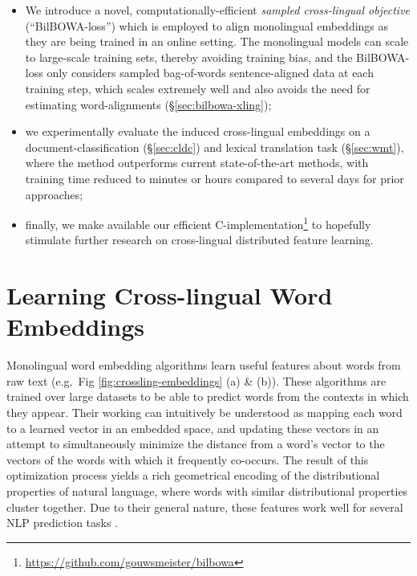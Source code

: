 \documentclass[10pt]{article}
\begin{document}
\begin{itemize}
  \item We introduce a novel, computationally-efficient \emph{sampled
    cross-lingual objective} (``BilBOWA-loss'') which is employed to
    align monolingual embeddings as they are being trained in an online
    setting. The monolingual models can scale to large-scale training sets,
    thereby avoiding training bias, and the BilBOWA-loss only
    considers sampled bag-of-words sentence-aligned data at each training step,
    which scales extremely well and also avoids the need for estimating
    word-alignments (\S \ref{sec:bilbowa-xling});

  \item we experimentally evaluate the induced cross-lingual embeddings on a
    document-classification (\S \ref{sec:cldc}) and lexical translation task 
    (\S \ref{sec:wmt}), where the method outperforms current 
    state-of-the-art methods, with training time reduced to minutes or hours 
    compared to several days for prior approaches;

  \item finally, we make available our efficient C-implementation\footnote{
    \url{https://github.com/gouwsmeister/bilbowa}} to hopefully stimulate 
    further research on cross-lingual distributed feature learning.
\end{itemize}

\section{Learning Cross-lingual Word Embeddings}
\label{sec:related-work}

Monolingual word embedding algorithms
\cite{mikolov2013distributed,pennington2014glove} learn useful features about
words from raw text (e.g.\ Fig \ref{fig:crossling-embeddings} (a) \& (b)).  These
algorithms are trained over large datasets to be able to predict words from the
contexts in which they appear. Their working can
intuitively be understood as mapping each word to a learned vector in an
embedded space, and updating these vectors in an attempt to simultaneously
minimize the distance from a word's vector to the vectors of the words with
which it frequently co-occurs. The result of this optimization process yields 
a rich geometrical encoding of the distributional properties of natural language, 
where words with similar distributional properties cluster together. Due to 
their general nature, these features work well for several NLP prediction tasks 
\cite{collobert2011natural,turian2010word}.
\end{document}
